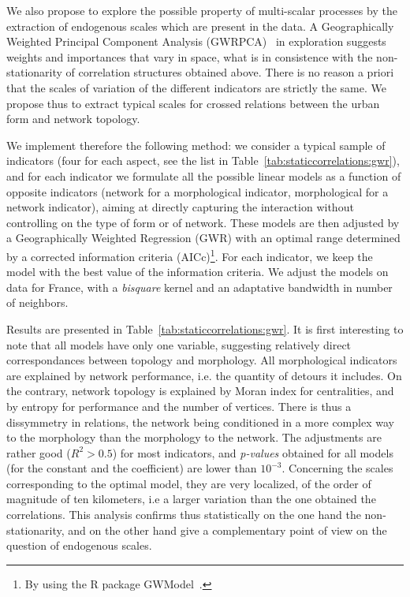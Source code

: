 We also propose to explore the possible property of multi-scalar processes by the extraction of endogenous scales which are present in the data. A Geographically Weighted Principal Component Analysis (GWRPCA)~\cite{harris2011geographically} in exploration suggests weights and importances that vary in space, what is in consistence with the non-stationarity of correlation structures obtained above. There is no reason a priori that the scales of variation of the different indicators are strictly the same. We propose thus to extract typical scales for crossed relations between the urban form and network topology.

We implement therefore the following method: we consider a typical sample of indicators (four for each aspect, see the list in Table~\ref{tab:staticcorrelations:gwr}), and for each indicator we formulate all the possible linear models as a function of opposite indicators (network for a morphological indicator, morphological for a network indicator), aiming at directly capturing the interaction without controlling on the type of form or of network. These models are then adjusted by a Geographically Weighted Regression (GWR) with an optimal range determined by a corrected information criteria (AICc)\footnote{By using the R package GWModel~\cite{gollini2013gwmodel}.}. For each indicator, we keep the model with the best value of the information criteria. We adjust the models on data for France, with a \emph{bisquare} kernel and an adaptative bandwidth in number of neighbors.


Results are presented in Table~\ref{tab:staticcorrelations:gwr}. It is first interesting to note that all models have only one variable, suggesting relatively direct correspondances between topology and morphology. All morphological indicators are explained by network performance, i.e. the quantity of detours it includes. On the contrary, network topology is explained by Moran index for centralities, and by entropy for performance and the number of vertices. There is thus a dissymmetry in relations, the network being conditioned in a more complex way to the morphology than the morphology to the network. The adjustments are rather good ($R^2 > 0.5$) for most indicators, and \emph{p-values} obtained for all models (for the constant and the coefficient) are lower than $10^{-3}$. Concerning the scales corresponding to the optimal model, they are very localized, of the order of magnitude of ten kilometers, i.e a larger variation than the one obtained the correlations. This analysis confirms thus statistically on the one hand the non-stationarity, and on the other hand give a complementary point of view on the question of endogenous scales.

